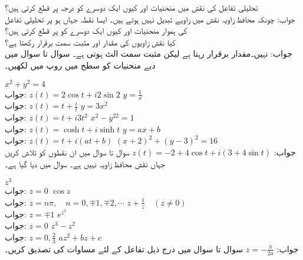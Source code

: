 تحلیلی تفاعل کی نقش میں منحنیات  اور   کیوں ایک دوسرے کو  درجہ پر قطع کرتی ہیں؟\\
جواب:\quad
چونکہ محافظ زاویہ نقش میں زاویے تبدیل نہیں ہوتے ہیں۔
ایسا نقطہ جہاں  ہو پر تحلیلی تفاعل  کی ہموار منحنیات  اور  کیوں ایک دوسرے کو  پر قطع کرتی ہیں؟\\
کیا نقش   زاویوں کی مقدار اور مثبت سمت برقرار رکھتا ہے؟\\
جواب:\quad
نہیں۔مقدار برقرار رہتا ہے لیکن مثبت سمت الٹ ہوتی ہے۔
سوال  تا سوال  میں دیے منحنیات کو  سطح  میں  روپ میں لکھیں۔

\quad
$x^2+y^2=4$\\
جواب:\quad
$z(t)=2\cos t+i2\sin 2$
\quad
$y=\tfrac{1}{x}$\\
جواب:\quad
$z(t)=t+\tfrac{i}{t}$
\quad
$y=3x^2$\\
جواب:\quad
$z(t)=t+i3t^2$
\quad
$x^2-y^22=1$\\
جواب:\quad
$z(t)=\cosh t+i\sinh t$
\quad
$y=ax+b$\\
جواب:\quad
$z(t)=t+i(at+b)$
\quad
$(x+2)^2+(y-3)^2=16$\\
جواب:\quad
$z(t)=-2+4\cos t+i(3+4\sin t)$
سوال  تا سوال  میں ان نقطوں کو تلاش کریں جہاں نقش   محافظ زاویہ نہیں ہے۔ سوال میں دیا گیا ہے۔ 

\quad
$z^3$\\
جواب:\quad
$z=0$
\quad
$\cos z$\\
جواب:\quad
$z=n\pi,\quad n=0,\mp 1,\mp 2,\cdots$
\quad
$z+\tfrac{1}{z}\quad (z\ne 0)$\\
جواب:\quad
$z=\mp 1$
\quad
$e^{z^2}$\\
جواب:\quad
$z=0$
\quad
$z^3-z^2$\\
جواب:\quad
$z=0, \tfrac{2}{3}$
\quad
$az^2+bz+c$\\
جواب:\quad
$z=-\tfrac{b}{2a}$
سوال  تا سوال   میں  درج ذیل تفاعل  کے لئے مساوات  کی تصدیق کریں۔

